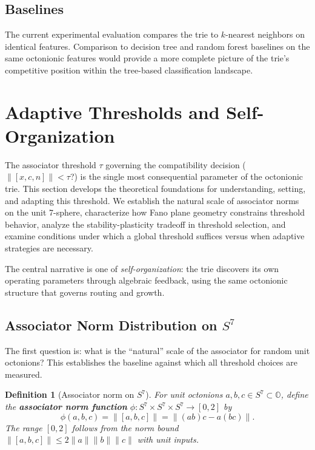 \documentclass[11pt,a4paper]{article}
\newtheorem{definition}[theorem]{Definition}
\theoremstyle{definition}
\theoremstyle{remark}
\newcommand{\Oct}{\mathbb{O}}
\begin{document}
\subsection{Baselines}

The current experimental evaluation compares the trie to $k$-nearest neighbors on identical features. Comparison to decision tree and random forest baselines on the same octonionic features would provide a more complete picture of the trie's competitive position within the tree-based classification landscape.

\section{Adaptive Thresholds and Self-Organization}
\label{sec:adaptive-thresholds}

The associator threshold $\tau$ governing the compatibility decision ($\lVert [x, c, n] \rVert < \tau$?) is the single most consequential parameter of the octonionic trie. This section develops the theoretical foundations for understanding, setting, and adapting this threshold. We establish the natural scale of associator norms on the unit 7-sphere, characterize how Fano plane geometry constrains threshold behavior, analyze the stability-plasticity tradeoff in threshold selection, and examine conditions under which a global threshold suffices versus when adaptive strategies are necessary.

The central narrative is one of \emph{self-organization}: the trie discovers its own operating parameters through algebraic feedback, using the same octonionic structure that governs routing and growth.

\subsection{Associator Norm Distribution on $S^7$}
\label{sec:assoc-distribution}

The first question is: what is the ``natural'' scale of the associator for random unit octonions? This establishes the baseline against which all threshold choices are measured.

\begin{definition}[Associator norm on $S^7$]
For unit octonions $a, b, c \in S^7 \subset \Oct$, define the \textbf{associator norm function} $\phi: S^7 \times S^7 \times S^7 \to [0, 2]$ by
\begin{equation}
  \phi(a, b, c) = \lVert [a, b, c] \rVert = \lVert (ab)c - a(bc) \rVert.
  \label{eq:assoc-norm}
\end{equation}
The range $[0, 2]$ follows from the norm bound $\lVert [a,b,c] \rVert \leq 2\lVert a \rVert \lVert b \rVert \lVert c \rVert$ with unit inputs.
\end{definition}
\end{document}
